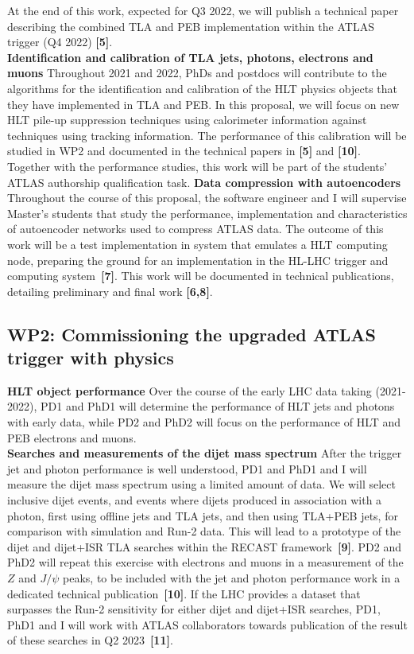 At the end of this work, expected for Q3 2022, we will publish a technical paper describing the combined TLA and PEB implementation within the ATLAS trigger (Q4 2022) \textbf{[5]}. \\
\textbf{Identification and calibration of TLA jets, photons, electrons and muons} Throughout 2021 and 2022, PhDs and postdocs will contribute to the algorithms for the identification and calibration of the HLT physics objects that they have implemented in TLA and PEB. 
In this proposal, we will focus on new HLT pile-up suppression techniques using calorimeter information against techniques using tracking information. 
The performance of this calibration will be studied in WP2 and documented in the technical papers in \textbf{[5]} and \textbf{[10]}.\\
Together with the performance studies, this work will be part of the students' ATLAS authorship qualification task.
\textbf{Data compression with autoencoders} Throughout the course of this proposal, the software engineer and I will supervise Master's students that study the performance, implementation and characteristics of autoencoder networks used to compress ATLAS data. 
The outcome of this work will be a test implementation in system that emulates a HLT computing node, preparing the ground for an implementation in the HL-LHC trigger and computing system~\textbf{[7]}. 
This work will be documented in technical publications, detailing preliminary and final work \textbf{[6,8]}.

\subsection{WP2: Commissioning the upgraded ATLAS trigger with physics}

\textbf{HLT object performance} Over the course of the early LHC data taking (2021-2022), 
PD1 and PhD1 will determine the performance of HLT jets and photons with early data, while PD2 and PhD2 will focus on the performance of HLT and PEB electrons and muons. \\
\textbf{Searches and measurements of the dijet mass spectrum} After the trigger jet and photon performance is well understood, PD1 and PhD1 and I will measure the dijet mass spectrum using a limited amount of data. 
We will select inclusive dijet events, and events where dijets produced in association with a photon, first using offline jets and TLA jets, and then using TLA+PEB jets, for comparison with simulation and Run-2 data. 
This will lead to a prototype of the dijet and dijet+ISR TLA searches within the RECAST framework~\textbf{[9]}.   
PD2 and PhD2 will repeat this exercise with electrons and muons in a measurement of the $Z$ and $J/\psi$ peaks, 
to be included with the jet and photon performance work in a dedicated technical publication~\textbf{[10]}. 
If the LHC provides a dataset that surpasses the Run-2 sensitivity for either dijet and dijet+ISR searches, 
PD1, PhD1 and I will work with ATLAS collaborators towards publication of the result of these searches in Q2 2023~\textbf{[11]}.

